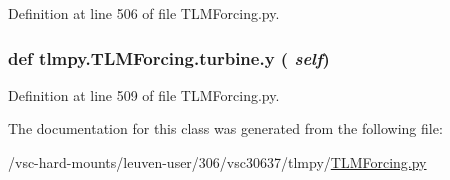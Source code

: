 Definition at line 506 of file TLMForcing.py.\hypertarget{classtlmpy_1_1TLMForcing_1_1turbine_a1393d4eb1b68fc925cc6362b4b3589b8}{
\subsubsection[{y}]{\setlength{\rightskip}{0pt plus 5cm}def tlmpy.TLMForcing.turbine.y ( {\em self})}}
\label{classtlmpy_1_1TLMForcing_1_1turbine_a1393d4eb1b68fc925cc6362b4b3589b8}


Definition at line 509 of file TLMForcing.py.

The documentation for this class was generated from the following file:\begin{DoxyCompactItemize}
\item 
/vsc-\/hard-\/mounts/leuven-\/user/306/vsc30637/tlmpy/\hyperlink{TLMForcing_8py}{TLMForcing.py}\end{DoxyCompactItemize}
